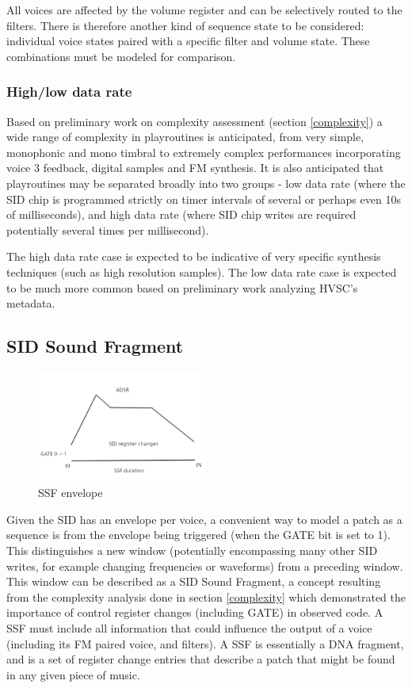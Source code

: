 \documentclass[10pt]{article}
\begin{document}
\begin{multicols*}{2}
All voices are affected by the volume register and can be selectively routed to the filters. There is therefore another kind of sequence state to be considered: individual voice states paired with a specific filter and volume state. These combinations must be modeled for comparison.

\subsubsection{High/low data rate}

Based on preliminary work on complexity assessment (section \ref{complexity}) a wide range of complexity in playroutines is anticipated, from very simple, monophonic and mono timbral to extremely complex performances incorporating voice 3 feedback, digital samples and FM synthesis. It is also anticipated that playroutines may be separated broadly into two groups - low data rate (where the SID chip is programmed strictly on timer intervals of several or perhaps even 10s of milliseconds), and high data rate (where SID chip writes are required potentially several times per millisecond).

The high data rate case is expected to be indicative of very specific synthesis techniques (such as high resolution samples). The low data rate case is expected to be much more common based on preliminary work analyzing HVSC’s metadata.

\subsection{SID Sound Fragment}
\label{ssf}

\begin{figure}[H]
\includegraphics[width=0.5\textwidth]{ssf}
\caption{SSF envelope}
\end{figure}

Given the SID has an envelope per voice, a convenient way to model a patch as a sequence is from the envelope being triggered (when the GATE bit is set to 1). This distinguishes a new window (potentially encompassing many other SID writes, for example changing frequencies or waveforms) from a preceding window. This window can be described as a SID Sound Fragment, a concept resulting from the complexity analysis done in section \ref{complexity} which demonstrated the importance of control register changes (including GATE) in observed code. A SSF must include all information that could influence the output of a voice (including its FM paired voice, and filters). A SSF is essentially a DNA fragment, and is a set of register change entries that describe a patch that might be found in any given piece of music.


\end{multicols*}
\end{document}
